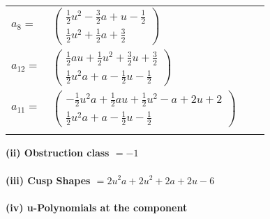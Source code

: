 \documentclass[1p]{elsarticle_modified}
\theoremstyle{definition}
\begin{document}
\begin{tabular}{m{7pt} m{180pt} m{7pt} m{180pt} }
\flushright $a_{8}=$&$\begin{pmatrix}\frac{1}{2} u^2-\frac{3}{2} a+u-\frac{1}{2}\\\frac{1}{2} u^2+\frac{1}{2} a+\frac{3}{2}\end{pmatrix}$ \\
\flushright $a_{12}=$&$\begin{pmatrix}\frac{1}{2} a u+\frac{1}{2} u^2+\frac{3}{2} u+\frac{3}{2}\\\frac{1}{2} u^2 a+a-\frac{1}{2} u-\frac{1}{2}\end{pmatrix}$ \\
\flushright $a_{11}=$&$\begin{pmatrix}-\frac{1}{2} u^2 a+\frac{1}{2} a u+\frac{1}{2} u^2- a+2 u+2\\\frac{1}{2} u^2 a+a-\frac{1}{2} u-\frac{1}{2}\end{pmatrix}$\\&\end{tabular}
\flushleft \textbf{(ii) Obstruction class $= -1$}\\~\\
\flushleft \textbf{(iii) Cusp Shapes $= 2 u^2 a+2 u^2+2 a+2 u-6$}\\~\\
\newpage\renewcommand{\arraystretch}{1}
\flushleft \textbf{(iv) u-Polynomials at the component}\newline \\
\end{document}
